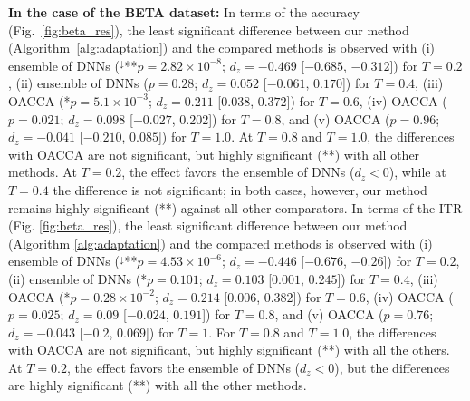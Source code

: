 \documentclass[12pt]{iopart}
\begin{document}
{\textbf{In the case of the BETA dataset:} In terms of the accuracy (Fig.~\ref{fig:beta_res}), the least significant difference between our method (Algorithm~\ref{alg:adaptation}) and the compared methods is observed with (i) ensemble of DNNs ($^{\downarrow}$**$p=2.82\times10^{-8}$; $d_z=-0.469$ [$-0.685$, $-0.312$]) for $T=0.2$, (ii) ensemble of DNNs ($p=0.28$; $d_z=0.052$ [$-0.061$, $0.170$]) for $T=0.4$, (iii) OACCA (*$p=5.1\times10^{-3}$; $d_z=0.211$ [$0.038$, $0.372$]) for $T=0.6$, (iv) OACCA ($p=0.021$; $d_z=0.098$ [$-0.027$, $0.202$]) for $T=0.8$, and (v) OACCA ($p=0.96$; $d_z=-0.041$ [$-0.210$, $0.085$]) for $T=1.0$. At $T=0.8$ and $T=1.0$, the differences with OACCA are not significant, but highly significant (**) with all other methods. At $T=0.2$, the effect favors the ensemble of DNNs ($d_z<0$), while at $T=0.4$ the difference is not significant; in both cases, however, our method remains highly significant (**) against all other comparators. In terms of the ITR (Fig. \ref{fig:beta_res}), the least significant difference between our method (Algorithm \ref{alg:adaptation}) and the compared methods is observed with (i) ensemble of DNNs ($^{\downarrow}$**$p=4.53\times10^{-6}$; $d_z=-0.446$ [$-0.676$, $-0.26$]) for $T=0.2$, (ii) ensemble of DNNs (*$p=0.101$; $d_z=0.103$ [$0.001$, $0.245$]) for $T=0.4$, (iii) OACCA (*$p=0.28 \times 10^{-2}$; $d_z=0.214$ [$0.006$, $0.382$]) for $T=0.6$, (iv) OACCA ($p=0.025$; $d_z=0.09$ [$-0.024$, $0.191$]) for $T=0.8$, and (v) OACCA ($p=0.76$; $d_z=-0.043$ [$-0.2$, $0.069$]) for $T=1$. For $T=0.8$ and $T=1.0$, the differences with OACCA are not significant, but highly significant (**) with all the others. At $T=0.2$, the effect favors the ensemble of DNNs ($d_z<0$), but the differences are highly significant (**) with all the other methods.}
\end{document}
